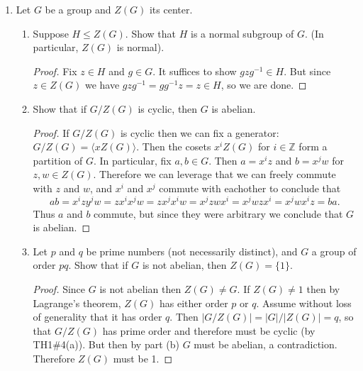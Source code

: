 \documentclass[11pt]{article}
\newcommand{\la}{\langle}
\newcommand{\ra}{\rangle}
\newcommand{\bZ}{\mathbb{Z}}
\begin{document}
\begin{enumerate}
\begin{enumerate}
\begin{proof}
      \[
      \begin{tikzcd}
        &G = MN\ar[dl,dash]\ar[dr,dash]&\\
        M\ar[dr,dash]&&N\ar[dl,dash]\\
        &\{1\} = M\cap N&
      \end{tikzcd}
      \]
      By the second isomorphism theorem we have $G/M\cong N$ and $G/N\cong M$.  Therefore, the result follows from the following chain of isomorphisms, where the first is part (a), and the second is the lemma.
      \[G\cong(G/M)\times(G/N)\cong N\times M.\]
    \end{proof}
  \end{enumerate}
  \item Let $G$ be a group and $Z(G)$ its center.
  \begin{enumerate}
    \item Suppose $H\le Z(G)$.  Show that $H$ is a normal subgroup of $G$.  (In particular, $Z(G)$ is normal).
    \begin{proof}
      Fix $z\in H$ and $g\in G$.  It suffices to show $gzg^{-1}\in H$.  But since $z\in Z(G)$ we have $gzg^{-1} = gg^{-1}z = z\in H$, so we are done.
    \end{proof}
    \item Show that if $G/Z(G)$ is cyclic, then $G$ is abelian.
    \begin{proof}
      If $G/Z(G)$ is cyclic then we can fix a generator: $G/Z(G) = \la xZ(G)\ra$.  Then the cosets $x^i Z(G)$ for $i\in\bZ$ form a partition of $G$.  In particular, fix $a,b\in G$.  Then $a = x^iz$ and $b=x^jw$ for $z,w\in Z(G)$.  Therefore we can leverage that we can freely commute with $z$ and $w$, and $x^i$ and $x^j$ commute with eachother to conclude that
      \[ab = x^izy^jw = zx^i x^j w = zx^j x^i w = x^j zw x^i = x^j wz x^i = x^j w x^i z = ba.\]
      Thus $a$ and $b$ commute, but since they were arbitrary we conclude that $G$ is abelian.
    \end{proof}
    \item Let $p$ and $q$ be prime numbers (not necessarily distinct), and $G$ a group of order $pq$.  Show that if $G$ is not abelian, then $Z(G) = \{1\}$.
    \begin{proof}
      Since $G$ is not abelian then $Z(G)\not=G$.  If $Z(G)\not=1$ then by Lagrange's theorem, $Z(G)$ has either order $p$ or $q$.  Assume without loss of generality that it has order $q$.  Then $|G/Z(G)| = |G|/|Z(G)| = q$, so that $G/Z(G)$ has prime order and therefore must be cyclic (by TH1\#4(a)).  But then by part (b) $G$ must be abelian, a contradiction.  Therefore $Z(G)$ must be 1.

\end{proof}
\end{enumerate}
\end{enumerate}
\end{document}
